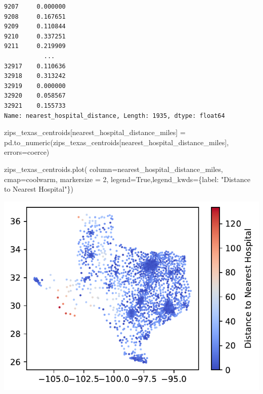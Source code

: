 \documentclass[
  letterpaper,
  DIV=11,
  numbers=noendperiod]{scrartcl}
\newenvironment{Shaded}{\begin{snugshade}}{\end{snugshade}}
\newcommand{\DecValTok}[1]{\textcolor[rgb]{0.68,0.00,0.00}{#1}}
\newcommand{\NormalTok}[1]{\textcolor[rgb]{0.00,0.23,0.31}{#1}}
\newcommand{\OperatorTok}[1]{\textcolor[rgb]{0.37,0.37,0.37}{#1}}
\newcommand{\StringTok}[1]{\textcolor[rgb]{0.13,0.47,0.30}{#1}}
\newcommand{\VariableTok}[1]{\textcolor[rgb]{0.07,0.07,0.07}{#1}}
\begin{document}
\begin{verbatim}
9207     0.000000
9208     0.167651
9209     0.110844
9210     0.337251
9211     0.219909
           ...   
32917    0.110636
32918    0.313242
32919    0.000000
32920    0.058567
32921    0.155733
Name: nearest_hospital_distance, Length: 1935, dtype: float64
\end{verbatim}

\begin{Shaded}
\begin{Highlighting}[]
\NormalTok{zips\_texas\_centroids[}\StringTok{\textquotesingle{}nearest\_hospital\_distance\_miles\textquotesingle{}}\NormalTok{] }\OperatorTok{=}\NormalTok{ pd.to\_numeric(zips\_texas\_centroids[}\StringTok{\textquotesingle{}nearest\_hospital\_distance\_miles\textquotesingle{}}\NormalTok{], errors}\OperatorTok{=}\StringTok{\textquotesingle{}coerce\textquotesingle{}}\NormalTok{)}

\NormalTok{zips\_texas\_centroids.plot(}
\NormalTok{    column}\OperatorTok{=}\StringTok{\textquotesingle{}nearest\_hospital\_distance\_miles\textquotesingle{}}\NormalTok{, }
\NormalTok{    cmap}\OperatorTok{=}\StringTok{\textquotesingle{}coolwarm\textquotesingle{}}\NormalTok{, markersize }\OperatorTok{=} \DecValTok{2}\NormalTok{,}
\NormalTok{    legend}\OperatorTok{=}\VariableTok{True}\NormalTok{,legend\_kwds}\OperatorTok{=}\NormalTok{\{}\StringTok{\textquotesingle{}label\textquotesingle{}}\NormalTok{: }\StringTok{"Distance to Nearest Hospital"}\NormalTok{\})}
\end{Highlighting}
\end{Shaded}

\includegraphics{ps4_files/figure-pdf/cell-28-output-1.pdf}
\end{document}

